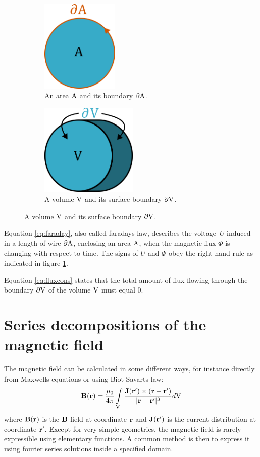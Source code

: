 \begin{figure}
    \centering
    \begin{subfigure}[b]{0.4\textwidth}
        \centering
        \includegraphics[height=125pt]{figs/partialA}
        \caption{An area $\mathrm{A}$ and its boundary $\partial \mathrm{A}$. }
        \label{fig:partialA}
    \end{subfigure}
    \hfill
    \begin{subfigure}[b]{0.4\textwidth}
        \centering
        \includegraphics[height=125pt]{figs/partialV}
        \caption{A volume $\mathrm{V}$ and its surface boundary $\partial \mathrm{V}$.}
        \label{fig:partialV}
    \end{subfigure}
\end{figure}
Equation \ref{eq:faraday}, also called faradays law, describes the voltage\
$U$ induced in a length of wire $\partial\mathrm{A}$, enclosing an area
$\mathrm{A}$, when the magnetic flux $\Phi$ is changing with respect to time.
The signs of $U$ and $\Phi$ obey the right hand rule as indicated
in figure \ref{fig:partialA}.

Equation \ref{eq:fluxcons} states that the total amount of flux flowing
through the boundary $\partial\mathrm{V}$ of the volume
$\mathrm{V}$ must equal 0.\cite[Ch.4.1.1]{russenschuck_field_2011}

\section{Series decompositions of the magnetic field} 
\label{sec:series_decompositions}
The magnetic field can be calculated in some different ways, for instance
directly from Maxwells equations or using Biot-Savarts law:
\begin{equation}
    \vb{B}(\vb{r}) = \frac{\mu_0}{4\pi}\int\limits_{\mathrm{V}}
    \frac{\vb{J}(\vb{r'})\times (\vb{r} - \vb{r'})}
    {|\vb{r} - \vb{r'}|^3} d\mathrm{V}
    \label{eq:Biot_Savart}
\end{equation}
where $\vb{B}(\vb{r})$ is the $\vb{B}$ field at coordinate $\vb{r}$ and
$\vb{J}(\vb{r'})$ is the current distribution at coordinate $\vb{r'}$.
\cite[Ch.5.4]{russenschuck_field_2011}
Except for very simple geometries, the magnetic field is rarely
expressible using elementary functions. A common method is then
to express it using fourier series solutions inside a specified domain.
\cite[Ch.6]{russenschuck_field_2011}

